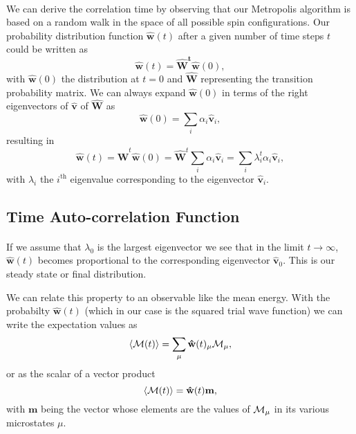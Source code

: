 \documentclass[%
twoside,                 %
final,                   %
10pt]{article}
\begin{document}
\paragraph{}
We can derive the correlation time by observing that our Metropolis algorithm is based on a random
walk in the space of all  possible spin configurations. 
Our probability 
distribution function $\mathbf{\hat{w}}(t)$ after a given number of time steps $t$ could be written as
\[
   \mathbf{\hat{w}}(t) = \mathbf{\hat{W}^t\hat{w}}(0),
\]
with $\mathbf{\hat{w}}(0)$ the distribution at $t=0$ and $\mathbf{\hat{W}}$ representing the 
transition probability matrix. 
We can always expand $\mathbf{\hat{w}}(0)$ in terms of the right eigenvectors of 
$\mathbf{\hat{v}}$ of $\mathbf{\hat{W}}$ as 
\[
    \mathbf{\hat{w}}(0)  = \sum_i\alpha_i\mathbf{\hat{v}}_i,
\]
resulting in 
\[
   \mathbf{\hat{w}}(t) = \mathbf{\hat{W}}^t\mathbf{\hat{w}}(0)=\mathbf{\hat{W}}^t\sum_i\alpha_i\mathbf{\hat{v}}_i=
\sum_i\lambda_i^t\alpha_i\mathbf{\hat{v}}_i,
\]
with $\lambda_i$ the $i^{\mathrm{th}}$ eigenvalue corresponding to  
the eigenvector $\mathbf{\hat{v}}_i$.






\subsection{Time Auto-correlation Function}

\paragraph{}
If we assume that $\lambda_0$ is the largest eigenvector we see that in the limit $t\rightarrow \infty$,
$\mathbf{\hat{w}}(t)$ becomes proportional to the corresponding eigenvector 
$\mathbf{\hat{v}}_0$. This is our steady state or final distribution. 

We can relate this property to an observable like the mean energy.
With the probabilty $\mathbf{\hat{w}}(t)$ (which in our case is the squared trial wave function) we
can write the expectation values as 
\[
 \langle {\cal M}(t) \rangle  = \sum_{\mu} \mathbf{\hat{w}}(t)_{\mu}{\cal M}_{\mu},
\] 
or as the scalar of a  vector product
 \[
 \langle {\cal M}(t) \rangle  = \mathbf{\hat{w}}(t)\mathbf{m},
\] 
with $\mathbf{m}$ being the vector whose elements are the values of ${\cal M}_{\mu}$ in its 
various microstates $\mu$.
\end{document}
